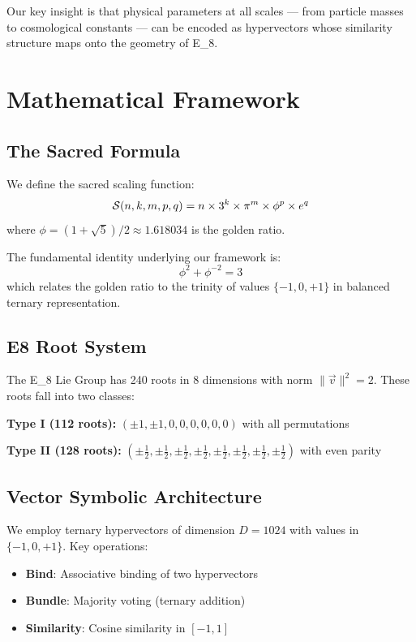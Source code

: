 \documentclass[12pt,a4paper]{article}
\newcommand{\EIGHT}{{\rm E}_8}
\newcommand{\sacred}{{\cal S}}
\begin{document}
Our key insight is that physical parameters at all scales — from particle masses to cosmological constants — can be encoded as hypervectors whose similarity structure maps onto the geometry of \EIGHT.

\section{Mathematical Framework}

\subsection{The Sacred Formula}

We define the sacred scaling function:
\begin{equation}
\sacred(n,k,m,p,q) = n \times 3^k \times \pi^m \times \phi^p \times e^q
\end{equation}
where $\phi = (1+\sqrt{5})/2 \approx 1.618034$ is the golden ratio.

The fundamental identity underlying our framework is:
\begin{equation}
\phi^2 + \phi^{-2} = 3
\end{equation}
which relates the golden ratio to the trinity of values $\{-1, 0, +1\}$ in balanced ternary representation.

\subsection{E8 Root System}

The \EIGHT{} Lie Group has 240 roots in 8 dimensions with norm $\|\vec{v}\|^2 = 2$. These roots fall into two classes:

\textbf{Type I (112 roots):} $(\pm 1, \pm 1, 0, 0, 0, 0, 0, 0)$ with all permutations

\textbf{Type II (128 roots):} $(\pm \tfrac12, \pm \tfrac12, \pm \tfrac12, \pm \tfrac12, \pm \tfrac12, \pm \tfrac12, \pm \tfrac12, \pm \tfrac12)$ with even parity

\subsection{Vector Symbolic Architecture}

We employ ternary hypervectors of dimension $D = 1024$ with values in $\{-1, 0, +1\}$. Key operations:

\begin{itemize}
\item \textbf{Bind}: Associative binding of two hypervectors
\item \textbf{Bundle}: Majority voting (ternary addition)
\item \textbf{Similarity}: Cosine similarity in $[-1, 1]$
\end{itemize}
\end{document}
